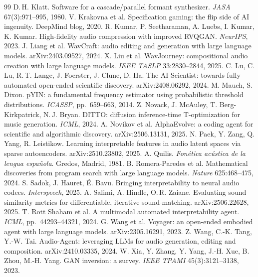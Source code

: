 \documentclass[10pt,twocolumn]{article}
\begin{document}
{\begin{thebibliography}{99}
 D.\,H. Klatt. Software for a cascade/parallel formant synthesizer. \emph{JASA} 67(3):971--995, 1980.
 V. Krakovna et al. Specification gaming: the flip side of AI ingenuity. DeepMind blog, 2020.
 R. Kumar, P. Seetharaman, A. Luebs, I. Kumar, K. Kumar. High-fidelity audio compression with improved RVQGAN. \emph{NeurIPS}, 2023.
 J. Liang et al. WavCraft: audio editing and generation with large language models. arXiv:2403.09527, 2024.
 X. Liu et al. WavJourney: compositional audio creation with large language models. \emph{IEEE TASLP} 33:2830--2844, 2025.
 C. Lu, C. Lu, R.\,T. Lange, J. Foerster, J. Clune, D. Ha. The AI Scientist: towards fully automated open-ended scientific discovery. arXiv:2408.06292, 2024.
 M. Mauch, S. Dixon. pYIN: a fundamental frequency estimator using probabilistic threshold distributions. \emph{ICASSP}, pp.\ 659--663, 2014.
 Z. Novack, J. McAuley, T. Berg-Kirkpatrick, N.\,J. Bryan. DITTO: diffusion inference-time T-optimization for music generation. \emph{ICML}, 2024.
 A. Novikov et al. AlphaEvolve: a coding agent for scientific and algorithmic discovery. arXiv:2506.13131, 2025.
 N. Paek, Y. Zang, Q. Yang, R. Leistikow. Learning interpretable features in audio latent spaces via sparse autoencoders. arXiv:2510.23802, 2025.
 A. Quilis. \emph{Fonética acústica de la lengua española}. Gredos, Madrid, 1981.
 B. Romera-Paredes et al. Mathematical discoveries from program search with large language models. \emph{Nature} 625:468--475, 2024.
 S. Sadok, J. Hauret, É. Bavu. Bringing interpretability to neural audio codecs. \emph{Interspeech}, 2025.
 A. Salimi, A. Hindle, O.\,R. Zaiane. Evaluating sound similarity metrics for differentiable, iterative sound-matching. arXiv:2506.22628, 2025.
 T. Rott Shaham et al. A multimodal automated interpretability agent. \emph{ICML}, pp.\ 44293--44321, 2024.
 G. Wang et al. Voyager: an open-ended embodied agent with large language models. arXiv:2305.16291, 2023.
 Z. Wang, C.-K. Tang, Y.-W. Tai. Audio-Agent: leveraging LLMs for audio generation, editing and composition. arXiv:2410.03335, 2024.
 W. Xia, Y. Zhang, Y. Yang, J.-H. Xue, B. Zhou, M.-H. Yang. GAN inversion: a survey. \emph{IEEE TPAMI} 45(3):3121--3138, 2023.

\end{thebibliography}}
\end{document}
